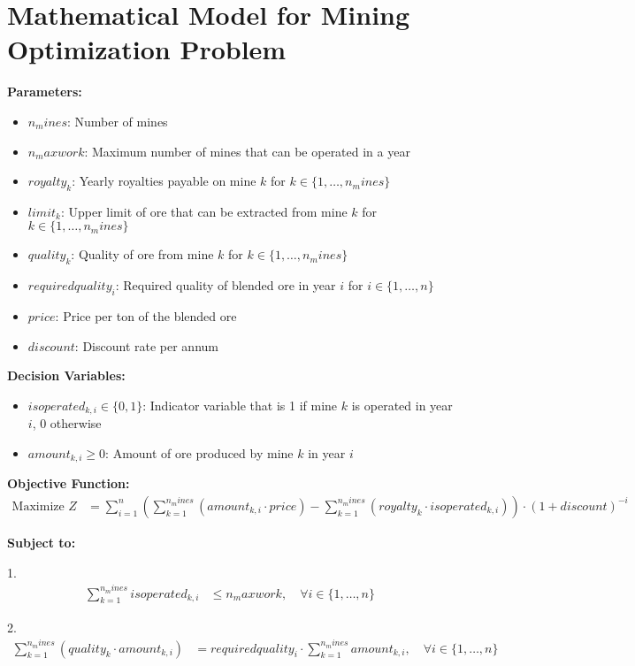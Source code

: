 \documentclass{article}
\begin{document}
\section*{Mathematical Model for Mining Optimization Problem}

\textbf{Parameters:}
\begin{itemize}
    \item $n_mines$: Number of mines
    \item $n_maxwork$: Maximum number of mines that can be operated in a year
    \item $royalty_k$: Yearly royalties payable on mine $k$ for $k \in \{1, \dots, n_mines\}$
    \item $limit_k$: Upper limit of ore that can be extracted from mine $k$ for $k \in \{1, \dots, n_mines\}$
    \item $quality_k$: Quality of ore from mine $k$ for $k \in \{1, \dots, n_mines\}$
    \item $requiredquality_i$: Required quality of blended ore in year $i$ for $i \in \{1, \dots, n\}$
    \item $price$: Price per ton of the blended ore
    \item $discount$: Discount rate per annum
\end{itemize}

\textbf{Decision Variables:}
\begin{itemize}
    \item $isoperated_{k,i} \in \{0, 1\}$: Indicator variable that is 1 if mine $k$ is operated in year $i$, 0 otherwise
    \item $amount_{k,i} \geq 0$: Amount of ore produced by mine $k$ in year $i$
\end{itemize}

\textbf{Objective Function:}
\begin{align*}
\text{Maximize } Z &= \sum_{i=1}^{n} \left( \sum_{k=1}^{n_mines} (amount_{k,i} \cdot price) - \sum_{k=1}^{n_mines} (royalty_k \cdot isoperated_{k,i}) \right) \cdot (1 + discount)^{-i}
\end{align*}

\textbf{Subject to:}

1.  
\begin{align*}
\sum_{k=1}^{n_mines} isoperated_{k,i} &\leq n_maxwork, \quad \forall i \in \{1,\dots,n\}
\end{align*}

2.  
\begin{align*}
\sum_{k=1}^{n_mines} \left( quality_k \cdot amount_{k,i} \right) &= requiredquality_i \cdot \sum_{k=1}^{n_mines} amount_{k,i}, \quad \forall i \in \{1,\dots,n\}
\end{align*}
\end{document}
